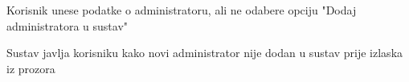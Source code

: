 \begin{packed_item}
\begin{packed_item}
\begin{packed_enum}
							\end{packed_enum}
	
							\item[4.a]  Korisnik unese podatke o administratoru, ali ne odabere opciju "Dodaj administratora u sustav"
							\item[] \begin{packed_enum}
								
								\item Sustav javlja korisniku kako novi administrator nije dodan u sustav prije izlaska iz prozora
								
							\end{packed_enum}
						
							
						\end{packed_item}
			
					\end{packed_item}
				
